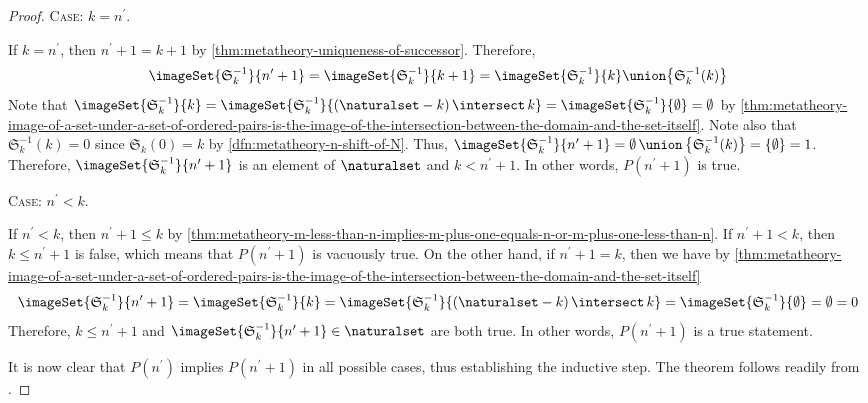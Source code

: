 \begin{proof}
    \vspace{0.3cm}
    \noindent
    {\scshape Case}: \( k = n^{\prime} \).

    \vspace{0.3cm}
    \noindent
    If \( k = n^{\prime} \), then \( n^{\prime} + 1 = k + 1 \) by \cref{thm:metatheory-uniqueness-of-successor}.
    Therefore,
    \begin{equation*}
        \imageSet{\mathfrak{S}^{-1}_{k}}{n^{\prime} + 1} =
        \imageSet{\mathfrak{S}^{-1}_{k}}{k + 1} =
        \imageSet{\mathfrak{S}^{-1}_{k}}{k} \union \mleft\{ \mathfrak{S}^{-1}_{k}(k) \mright\}
    \end{equation*}
    Note that \( \imageSet{\mathfrak{S}^{-1}_{k}}{k} = \imageSet{\mathfrak{S}^{-1}_{k}}{ \mleft( \naturalset - k \mright) \, {\intersect}\, k }
    = \imageSet{\mathfrak{S}^{-1}_{k}}{\emptyset}
    = \emptyset \) by \cref{thm:metatheory-image-of-a-set-under-a-set-of-ordered-pairs-is-the-image-of-the-intersection-between-the-domain-and-the-set-itself}.
    Note also that \( \mathfrak{S}^{-1}_{k}(k) = 0 \) since \( \mathfrak{S}_{k}(0) = k \) by
    \cref{dfn:metatheory-n-shift-of-N}.
    Thus, \( \imageSet{\mathfrak{S}^{-1}_{k}}{n^{\prime} + 1} = \emptyset \,{\union}\, \mleft\{ \mathfrak{S}^{-1}_{k}(k) \mright\} = \mleft\{ \emptyset \mright\} = 1 \).
    Therefore, \( \imageSet{\mathfrak{S}^{-1}_{k}}{n^{\prime} + 1} \) is an element of \( \naturalset \) and \( k < n^{\prime} + 1 \).
    In other words, \( P(n^{\prime} + 1) \) is true.

    \vspace{0.3cm}
    \noindent
    {\scshape Case}: \( n^{\prime} < k \).

    \vspace{0.3cm}
    \noindent
    If \( n^{\prime} < k \), then \( n^{\prime} + 1 \leq k \) by \cref{thm:metatheory-m-less-than-n-implies-m-plus-one-equals-n-or-m-plus-one-less-than-n}.
    If \( n^{\prime} + 1 < k \), then \( k \leq n^{\prime} + 1 \) is false, which means that \( P(n^{\prime} + 1) \) is vacuously true.
    On the other hand, if \( n^{\prime} + 1 = k \), then we have
    by \cref{thm:metatheory-image-of-a-set-under-a-set-of-ordered-pairs-is-the-image-of-the-intersection-between-the-domain-and-the-set-itself}
    \begin{equation*}
        \imageSet{\mathfrak{S}^{-1}_{k}}{n^{\prime} + 1} = \imageSet{\mathfrak{S}^{-1}_{k}}{k} = \imageSet{ \mathfrak{S}^{-1}_{k} }{\mleft( \naturalset - k \mright) \, {\intersect}\, k} = \imageSet{\mathfrak{S}^{-1}_{k}}{\emptyset} = \emptyset = 0
    \end{equation*}
    Therefore, \( k \leq n^{\prime} + 1 \) and \( \imageSet{\mathfrak{S}^{-1}_{k}}{n^{\prime} + 1} \in \naturalset \) are both true.
    In other words, \( P(n^{\prime} + 1) \) is a true statement.

    \vspace{0.3cm}
    \noindent
    It is now clear that \( P(n^{\prime}) \) implies \( P(n^{\prime} + 1) \) in all possible cases, thus establishing the inductive step.
    The theorem follows readily from .
\end{proof}


